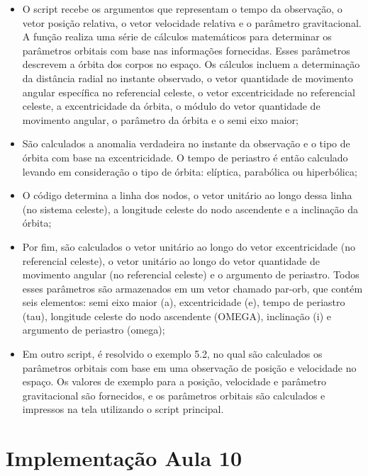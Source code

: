 \begin{itemize}
    \item O script recebe os argumentos que representam o tempo da observação, o vetor posição relativa, o vetor velocidade relativa e o parâmetro gravitacional. A função realiza uma série de cálculos matemáticos para determinar os parâmetros orbitais com base nas informações fornecidas. Esses parâmetros descrevem a órbita dos corpos no espaço. Os cálculos incluem a determinação da distância radial no instante observado, o vetor quantidade de movimento angular específica no referencial celeste, o vetor excentricidade no referencial celeste, a excentricidade da órbita, o módulo do vetor quantidade de movimento angular, o parâmetro da órbita e o semi eixo maior;

    \item São calculados a anomalia verdadeira no instante da observação e o tipo de órbita com base na excentricidade. O tempo de periastro é então calculado levando em consideração o tipo de órbita: elíptica, parabólica ou hiperbólica;
    
    \item O código determina a linha dos nodos, o vetor unitário ao longo dessa linha (no sistema celeste), a longitude celeste do nodo ascendente e a inclinação da órbita;

    \item Por fim, são calculados o vetor unitário ao longo do vetor excentricidade (no referencial celeste), o vetor unitário ao longo do vetor quantidade de movimento angular (no referencial celeste) e o argumento de periastro. Todos esses parâmetros são armazenados em um vetor chamado par-orb, que contém seis elementos: semi eixo maior (a), excentricidade (e), tempo de periastro (tau), longitude celeste do nodo ascendente (OMEGA), inclinação (i) e argumento de periastro (omega);
    \item Em outro script, é resolvido o exemplo 5.2, no qual são calculados os parâmetros orbitais com base em uma observação de posição e velocidade no espaço. Os valores de exemplo para a posição, velocidade e parâmetro gravitacional são fornecidos, e os parâmetros orbitais são calculados e impressos na tela utilizando o script principal. 
\end{itemize}

\section{Implementação Aula 10}

